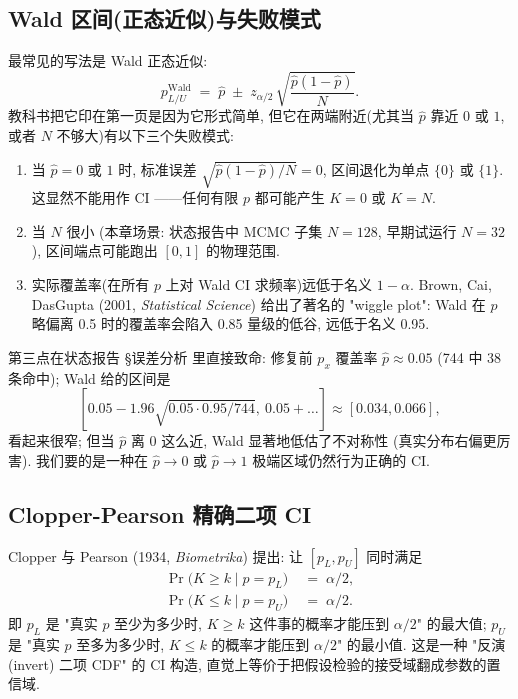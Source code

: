\subsection{Wald 区间(正态近似)与失败模式}
\label{sec:partIII:coverage_methodology:wald}

最常见的写法是 Wald 正态近似:
\[
  p_{L/U}^{\mathrm{Wald}} \;=\; \hat p \;\pm\; z_{\alpha/2}\, \sqrt{\frac{\hat p (1 - \hat p)}{N}}.
\]
教科书把它印在第一页是因为它形式简单, 但它在两端附近(尤其当 $\hat p$ 靠近 $0$ 或 $1$, 或者 $N$ 不够大)有以下三个失败模式:

\begin{enumerate}[label=(\alph*), nosep]
  \item 当 $\hat p = 0$ 或 $1$ 时, 标准误差 $\sqrt{\hat p(1-\hat p)/N} = 0$, 区间退化为单点 $\{0\}$ 或 $\{1\}$. 这显然不能用作 CI ——任何有限 $p$ 都可能产生 $K = 0$ 或 $K = N$.
  \item 当 $N$ 很小 (本章场景: 状态报告中 MCMC 子集 $N = 128$, 早期试运行 $N = 32$), 区间端点可能跑出 $[0, 1]$ 的物理范围.
  \item 实际覆盖率(在所有 $p$ 上对 Wald CI 求频率)远低于名义 $1 - \alpha$. Brown, Cai, DasGupta (2001, \emph{Statistical Science}) 给出了著名的 "wiggle plot": Wald 在 $p$ 略偏离 0.5 时的覆盖率会陷入 0.85 量级的低谷, 远低于名义 0.95.
\end{enumerate}

第三点在状态报告 §误差分析 里直接致命: 修复前 $p_x$ 覆盖率 $\hat p \approx 0.05$ (744 中 38 条命中); Wald 给的区间是
\[
  [0.05 - 1.96\sqrt{0.05\cdot 0.95/744},\ 0.05 + \ldots] \approx [0.034, 0.066],
\]
看起来很窄; 但当 $\hat p$ 离 0 这么近, Wald 显著地低估了不对称性 (真实分布右偏更厉害). 我们要的是一种在 $\hat p \to 0$ 或 $\hat p \to 1$ 极端区域仍然行为正确的 CI.

\subsection{Clopper-Pearson 精确二项 CI}
\label{sec:partIII:coverage_methodology:cp}

Clopper 与 Pearson (1934, \emph{Biometrika}) 提出: 让 $[p_L, p_U]$ 同时满足
\begin{align}
  \Pr\bigl(K \ge k \mid p = p_L\bigr) &\;=\; \alpha/2, \\
  \Pr\bigl(K \le k \mid p = p_U\bigr) &\;=\; \alpha/2.
\end{align}
即 $p_L$ 是 "真实 $p$ 至少为多少时, $K \ge k$ 这件事的概率才能压到 $\alpha/2$" 的最大值; $p_U$ 是 "真实 $p$ 至多为多少时, $K \le k$ 的概率才能压到 $\alpha/2$" 的最小值. 这是一种 "反演 (invert) 二项 CDF" 的 CI 构造, 直觉上等价于把假设检验的接受域翻成参数的置信域.

